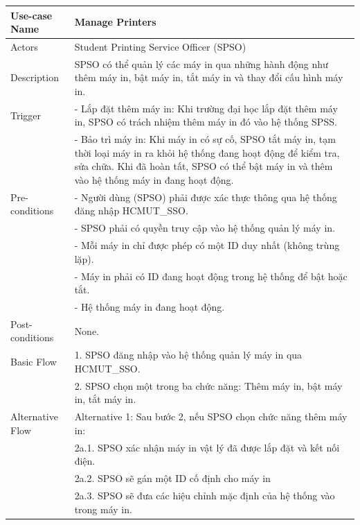 \begin{enumerate}[a)]
    \begin{longtable}{|l|p{10cm}|}
        \hline
        \endhead
        \hline
        \endfoot
        Use-case Name & \textbf{Manage Printers}\\
        \hline
        Actors & Student Printing Service Officer (SPSO) \\
        \hline
        Description & SPSO có thể quản lý các máy in qua những hành động như thêm máy in, bật máy in, tắt máy in và thay đổi cấu hình máy in.
        \\
        \hline
        Trigger 
            & - Lắp đặt thêm máy in: Khi trường đại học lắp đặt thêm máy in, SPSO có trách nhiệm thêm máy in đó vào hệ thống SPSS. \\
            & - Bảo trì máy in: Khi máy in có sự cố, SPSO tắt máy in, tạm thời loại máy in ra khỏi hệ thống đang hoạt động để kiểm tra, sửa chữa. Khi đã hoàn tất, SPSO có thể bật máy in và thêm vào hệ thống máy in đang hoạt động.
        \\
        \hline
        Pre-conditions &  
            - Người dùng (SPSO) phải được xác thực thông qua hệ thống đăng nhập HCMUT\_SSO. \\ &
            - SPSO phải có quyền truy cập vào hệ thống quản lý máy in. \\ &
            - Mỗi máy in chỉ được phép có một ID duy nhất (không trùng lặp). \\ &
            - Máy in phải có ID đang hoạt động trong hệ thống để bật hoặc tắt. \\ &
            - Hệ thống máy in đang hoạt động.
        \\
        \hline
        Post-conditions & None.\\
        \hline
        Basic Flow & 
            1. SPSO đăng nhập vào hệ thống quản lý máy in qua HCMUT\_SSO. \\ &
            2. SPSO chọn một trong ba chức năng: Thêm máy in, bật máy in, tắt máy in.
        \\
        \hline
        Alternative Flow & Alternative 1: Sau bước 2, nếu SPSO chọn chức năng thêm máy in:\\
        & \hspace{1em} 2a.1. SPSO xác nhận máy in vật lý đã được lắp đặt và kết nối điện.\\
        & \hspace{1em} 2a.2. SPSO sẽ gán một ID cố định cho máy in\\
        & \hspace{1em} 2a.3. SPSO sẽ đưa các hiệu chỉnh mặc định của hệ thống vào trong máy in.\\

\end{longtable}
\end{enumerate}
